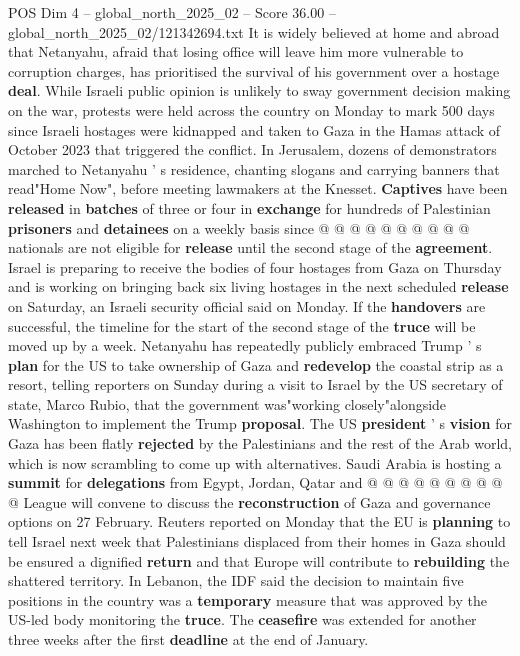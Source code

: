 \begin{textsample}{POS Dim 4 – global\_north\_2025\_02 – Score 36.00 – global\_north\_2025\_02/121342694.txt}
It is widely believed at home and abroad that Netanyahu, afraid that losing office will leave him more vulnerable to corruption charges, has prioritised the survival of his government over a hostage \textbf{deal}.
While Israeli public opinion is unlikely to sway government decision making on the war, protests were held across the country on Monday to mark 500 days since Israeli hostages were kidnapped and taken to Gaza in the Hamas attack of October 2023 that triggered the conflict.
In Jerusalem, dozens of demonstrators marched to Netanyahu ' s residence, chanting slogans and carrying banners that read"Home Now", before meeting lawmakers at the Knesset. \textbf{Captives} have been \textbf{released} in \textbf{batches} of three or four in \textbf{exchange} for hundreds of Palestinian \textbf{prisoners} and \textbf{detainees} on a weekly basis since @ @ @ @ @ @ @ @ @ @ nationals are not eligible for \textbf{release} until the second stage of the \textbf{agreement}.
Israel is preparing to receive the bodies of four hostages from Gaza on Thursday and is working on bringing back six living hostages in the next scheduled \textbf{release} on Saturday, an Israeli security official said on Monday.
If the \textbf{handovers} are successful, the timeline for the start of the second stage of the \textbf{truce} will be moved up by a week.
Netanyahu has repeatedly publicly embraced Trump ' s \textbf{plan} for the US to take ownership of Gaza and \textbf{redevelop} the coastal strip as a resort, telling reporters on Sunday during a visit to Israel by the US secretary of state, Marco Rubio, that the government was"working closely"alongside Washington to implement the Trump \textbf{proposal}.
The US \textbf{president} ' s \textbf{vision} for Gaza has been flatly \textbf{rejected} by the Palestinians and the rest of the Arab world, which is now scrambling to come up with alternatives.
Saudi Arabia is hosting a \textbf{summit} for \textbf{delegations} from Egypt, Jordan, Qatar and @ @ @ @ @ @ @ @ @ @ League will convene to discuss the \textbf{reconstruction} of Gaza and governance options on 27 February.
Reuters reported on Monday that the EU is \textbf{planning} to tell Israel next week that Palestinians displaced from their homes in Gaza should be ensured a dignified \textbf{return} and that Europe will contribute to \textbf{rebuilding} the shattered territory.
In Lebanon, the IDF said the decision to maintain five positions in the country was a \textbf{temporary} measure that was approved by the US-led body monitoring the \textbf{truce}.
The \textbf{ceasefire} was extended for another three weeks after the first \textbf{deadline} at the end of January.

\end{textsample}
